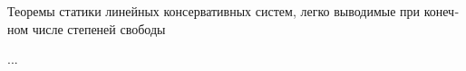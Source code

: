 

\begin{otherlanguage}{russian}

Теоремы статики линейных консервативных систем, легко выводимые при конечном числе степеней свободы

...



\end{otherlanguage}



\label{para:caseoflatenttrihedron.smalldisplacementsandrotations}

